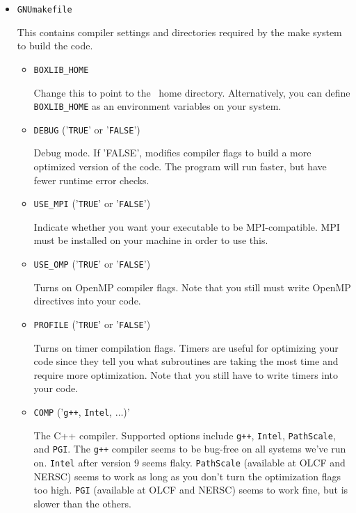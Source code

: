 \begin{itemize}
\item {\tt GNUmakefile}

This contains compiler settings and directories required by the make system to build the code.

  \begin{itemize}

    \item {\tt BOXLIB\_HOME}

    Change this to point to the \BoxLib\ home directory.  Alternatively, you can define {\tt BOXLIB\_HOME}
    as an environment variables on your system.

    \item {\tt DEBUG} ('{\tt TRUE}' or '{\tt FALSE}')
      
    Debug mode.  If 'FALSE', modifies compiler flags to build a more optimized version of the code.
    The program will run faster, but have fewer runtime error checks.

    \item {\tt USE\_MPI} ('{\tt TRUE}' or '{\tt FALSE}')

    Indicate whether you want your executable to be MPI-compatible.  MPI must be installed on your
    machine in order to use this.

    \item {\tt USE\_OMP} ('{\tt TRUE}' or '{\tt FALSE}')

    Turns on OpenMP compiler flags.  Note that you still must write OpenMP directives into your code.

    \item {\tt PROFILE} ('{\tt TRUE}' or '{\tt FALSE}')

    Turns on timer compilation flags.  Timers are useful for optimizing your code since they tell you 
    what subroutines are taking the most time and require more optimization.  Note that you still have 
    to write timers into your code.

    \item {\tt COMP} ('{\tt g++}, {\tt Intel}, $\ldots$)'

    The C++ compiler.  Supported options include {\tt g++}, {\tt Intel}, {\tt PathScale}, and 
    {\tt PGI}.  The {\tt g++} compiler seems to 
    be bug-free on all systems we've run on.  {\tt Intel} after version 9 seems flaky.  {\tt PathScale} 
    (available at OLCF and NERSC) seems to work as long as you don't turn the optimization flags too high.
    {\tt PGI} (available at OLCF and NERSC) seems to work fine, but is slower than the others.


\end{itemize}
\end{itemize}
